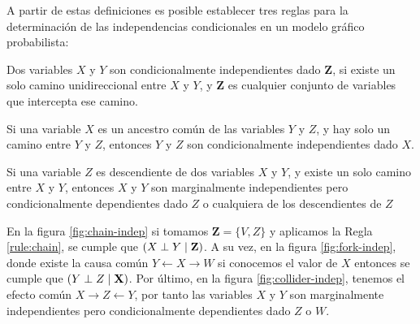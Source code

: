 A partir de estas definiciones es posible establecer tres reglas para la determinación de las independencias condicionales en un modelo gráfico probabilista:

\begin{rl}\label{rule:chain}
	Dos variables $X$ y $Y$ son condicionalmente independientes dado \textbf{Z}, si existe un solo camino unidireccional entre $X$ y $Y$, y \textbf{Z} es cualquier conjunto de variables que intercepta ese camino.
\end{rl}

\begin{rl}
	Si una variable $X$ es un ancestro común de las variables $Y$ y $Z$, y hay solo
	un camino entre $Y$ y $Z$, entonces $Y$ y $Z$ son condicionalmente independientes
	dado $X$.	
\end{rl}

\begin{rl}
	Si una variable $Z$ es descendiente de dos variables $X$ y $Y$, y existe un solo camino entre $X$ y $Y$, entonces $X$ y $Y$ son marginalmente independientes pero condicionalmente dependientes dado $Z$ o cualquiera de los descendientes de $Z$
\end{rl}

En la figura \ref{fig:chain-indep} si tomamos  $\textbf{Z}=\{V,Z\}$ y aplicamos la Regla \ref{rule:chain}, se cumple que $(X \perp Y \mid \textbf{Z})$. A su vez, en la figura \ref{fig:fork-indep}, donde existe la causa común $Y \leftarrow X \rightarrow W$ si conocemos el valor de $X$ entonces se cumple que $(Y \perp Z \mid \textbf{X})$. Por último, en la figura  \ref{fig:collider-indep}, tenemos el efecto común $X \rightarrow Z \leftarrow Y$, por tanto las variables $X$ y $Y$ son marginalmente independientes pero condicionalmente dependientes dado $Z$ o $W$.

